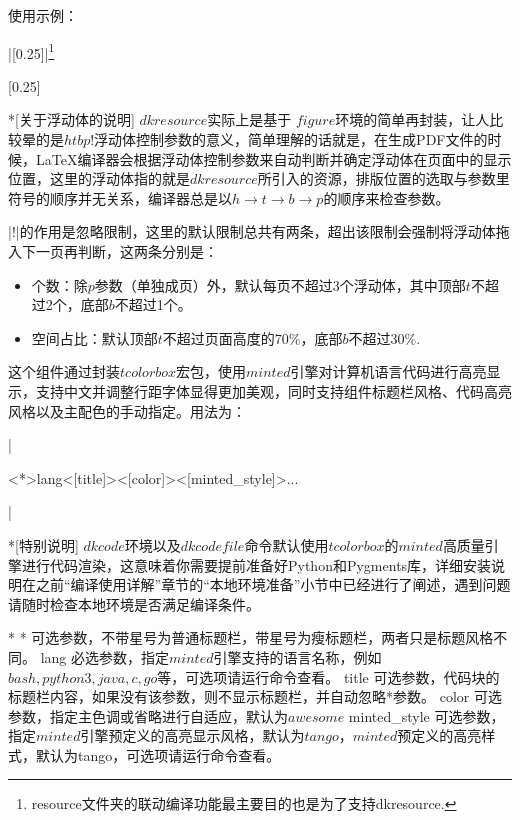 使用示例：

|[0.25]|\footnote{resource文件夹的联动编译功能最主要目的也是为了支持dkresource.}

[0.25]

\begin{dkcomment}*[关于浮动体的说明]
  \hspace{2em}$dkresource$实际上是基于{\LaTeXe} $figure$环境的简单再封装，让人比较晕的是$htbp!$浮动体控制参数的意义，简单理解的话就是，在生成PDF文件的时候，{\LaTeX}编译器会根据浮动体控制参数来自动判断并确定浮动体在页面中的显示位置，这里的浮动体指的就是$dkresource$所引入的资源，排版位置的选取与参数里符号的顺序并无关系，编译器总是以$h \to t \to b \to p$的顺序来检查参数。

  \hspace{2em}|!|的作用是忽略限制，这里的默认限制总共有两条，超出该限制会强制将浮动体拖入下一页再判断，这两条分别是：

  \begin{itemize}
    \item 个数：除$p$参数（单独成页）外，默认每页不超过3个浮动体，其中顶部$t$不超过2个，底部$b$不超过1个。
    \item 空间占比：默认顶部$t$不超过页面高度的70\%，底部$b$不超过30\%.
  \end{itemize}
\end{dkcomment}

这个组件通过封装$tcolorbox$宏包，使用$minted$引擎对计算机语言代码进行高亮显示，支持中文并调整行距字体显得更加美观，同时支持组件标题栏风格、代码高亮风格以及主配色的手动指定。用法为：

|\begin{dkcode}<*>{lang}<[title]><[color]><[minted_style]>...\end{dkcode}|

\begin{dkcomment}*[特别说明]
  $dkcode$环境以及$dkcodefile$命令默认使用$tcolorbox$的$minted$高质量引擎进行代码渲染，这意味着你需要提前准备好Python和Pygments库，详细安装说明在之前“编译使用详解”章节的“本地环境准备”小节中已经进行了阐述，遇到问题请随时检查本地环境是否满足编译条件。
\end{dkcomment}

\begin{cvskills}*
  \cvskill
  {*}
  {可选参数，不带星号为普通标题栏，带星号为瘦标题栏，两者只是标题风格不同。}
  \cvskill
  {lang}
  {必选参数，指定$minted$引擎支持的语言名称，例如$bash, python3, java, c, go$等，可选项请运行命令查看。}
  \cvskill
  {title}
  {可选参数，代码块的标题栏内容，如果没有该参数，则不显示标题栏，并自动忽略*参数。}
  \cvskill
  {color}
  {可选参数，指定主色调或省略进行自适应，默认为$awesome$}
  \cvskill
  {minted\_style}
  {可选参数，指定$minted$引擎预定义的高亮显示风格，默认为$tango$，$minted$预定义的高亮样式，默认为tango，可选项请运行命令查看。}
\end{cvskills}


